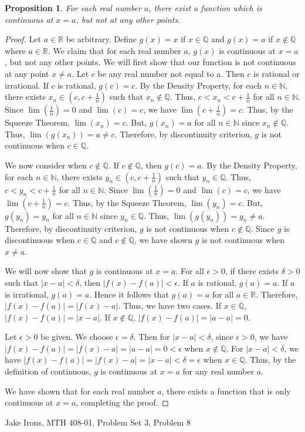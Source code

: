 \documentclass[11 pt]{article}
\newtheorem{proposition}{Proposition}
\newcommand{\newpar}{\vspace{.15in}\noindent}
\begin{document}
\newpar
\begin{proposition}
For each real number $a$, there exist a function which is continuous at $x=a$, but not at any other points.

\end{proposition}
\begin{proof}
Let $a\in\mathbb{R}$ be arbitrary. Define $g(x)=x$ if $x\in\mathbb{Q}$ and $g(x)=a$ if $x\not\in\mathbb{Q}$ where $a\in\mathbb{R}$. We claim that for each real number $a$, $g(x)$ is continuous at $x=a$, but not any other points. We will first show that our function is not continuous at any point $x\neq a$. Let $c$ be any real number not equal to a. Then $c$ is rational or irrational. If $c$ is rational, $g(c)=c$. By the Density Property, for each $n\in\mathbb{N}$, there exists $x_n\in(c,c+\frac{1}{n})$ such that $x_n\not\in\mathbb{Q}$. Thus, $c<x_n<c+\frac{1}{n}$ for all $n\in\mathbb{N}$. Since $\lim(\frac{1}{n})=0$ and $\lim(c)=c$, we have $\lim(c+\frac{1}{n})=c$. Thus, by the Squeeze Theorem, $\lim(x_n)=c$. But, $g(x_n)=a$ for all $n\in\mathbb{N}$ since $x_n\not\in\mathbb{Q}$. Thus, $\lim(g(x_n))=a\neq c$. Therefore, by discontinuity criterion, $g$ is not continuous when $c\in\mathbb{Q}$.

\newpar
We now consider when $c\not\in\mathbb{Q}$. If $c\not\in\mathbb{Q}$, then $g(c)=a$. By the Density Property, for each $n\in\mathbb{N}$, there exists $y_n\in(c,c+\frac{1}{n})$ such that $y_n\in\mathbb{Q}$. Thus, $c<y_n<c+\frac{1}{n}$ for all $n\in\mathbb{N}$. Since $\lim(\frac{1}{n})=0$ and $\lim(c)=c$, we have $\lim(c+\frac{1}{n})=c$. Thus, by the Squeeze Theorem, $\lim(y_n)=c$. But, $g(y_n)=y_n$ for all $n\in\mathbb{N}$ since $y_n\in\mathbb{Q}$. Thus, $\lim(g(y_n))=y_n\neq a$. Therefore, by discontinuity criterion, $g$ is not continuous when $c\not\in\mathbb{Q}$. Since $g$ is discontinuous when $c\in\mathbb{Q}$ and $c\not\in\mathbb{Q}$, we have shown $g$ is not continuous when $x\neq a$.

\newpar
We will now show that $g$ is continuous at $x=a$. For all $\epsilon>0$, if there exists $\delta>0$ such that $\lvert x-a\rvert<\delta$, then $\lvert f(x)-f(a)\rvert<\epsilon$. If $a$ is rational, $g(a)=a$. If $a$ is irrational, $g(a)=a$. Hence it follows that $g(a)=a$ for all $a\in\mathbb{R}$. Therefore, $\lvert f(x)-f(a)\rvert=\lvert f(x)-a\rvert$. Thus, we have two cases. If $x\in\mathbb{Q}$, $\lvert f(x)-f(a)\rvert=\lvert x-a\rvert$. If $x\not\in\mathbb{Q}$, $\lvert f(x)-f(a)\rvert=\lvert a-a\rvert=0$. 

\newpar
Let $\epsilon>0$ be given. We choose $\epsilon=\delta$. Then for $\lvert x-a\rvert<\delta$, since $\epsilon>0$, we have $\lvert f(x)-f(a)\rvert=\lvert f(x)-a\rvert=\lvert a-a\rvert=0<\epsilon$ when $x\not\in\mathbb{Q}$. For $\lvert x-a\rvert<\delta$, we have $\lvert f(x)-f(a)\rvert=\lvert f(x)-a\rvert=\lvert x-a\rvert<\delta=\epsilon$ when $x\in\mathbb{Q}$. Thus, by the definition of continuous, $g$ is continuous at $x=a$ for any real number $a$.

\newpar
We have shown that for each real number $a$, there exists a function that is only continuous at $x=a$, completing the proof.
\end{proof}
\newpage
\noindent Jake Irons, MTH 408-01, Problem Set 3, Problem 8
\end{document}
